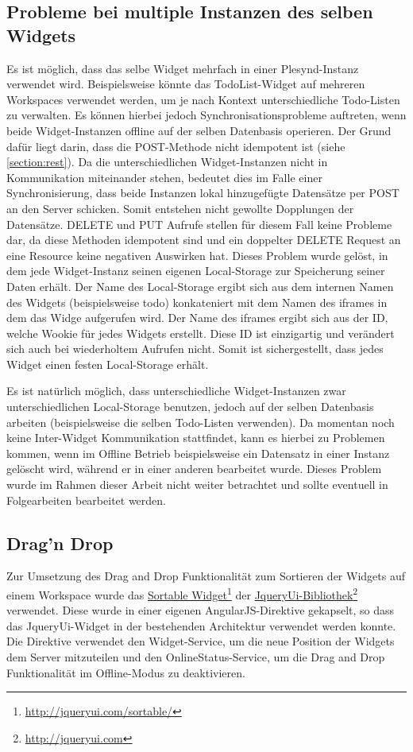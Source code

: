 \subsection{Probleme bei multiple Instanzen des selben Widgets}
Es ist möglich, dass das selbe Widget mehrfach in einer Plesynd-Instanz verwendet wird. Beispielsweise könnte das TodoList-Widget auf mehreren Workspaces verwendet werden, um je nach Kontext unterschiedliche Todo-Listen zu verwalten. Es können hierbei jedoch Synchronisationsprobleme auftreten, wenn beide Widget-Instanzen offline auf der selben Datenbasis operieren. Der Grund dafür liegt darin, dass die POST-Methode nicht idempotent ist (siehe \ref{section:rest}). Da die unterschiedlichen Widget-Instanzen nicht in Kommunikation miteinander stehen, bedeutet dies im Falle einer Synchronisierung, dass beide Instanzen lokal hinzugefügte Datensätze per POST an den Server schicken. Somit entstehen nicht gewollte Dopplungen der Datensätze. DELETE und PUT Aufrufe stellen für diesem Fall keine Probleme dar, da diese Methoden idempotent sind und ein doppelter DELETE Request an eine Resource keine negativen Auswirken hat. Dieses Problem wurde gelöst, in dem jede Widget-Instanz seinen eigenen Local-Storage zur Speicherung seiner Daten erhält. Der Name des Local-Storage ergibt sich aus dem internen Namen des Widgets (beispielsweise todo) konkateniert mit dem Namen des iframes in dem das Widge aufgerufen wird. Der Name des iframes ergibt sich aus der ID, welche Wookie für jedes Widgets erstellt. Diese ID ist einzigartig und verändert sich auch bei wiederholtem Aufrufen nicht. Somit ist sichergestellt, dass jedes Widget einen festen Local-Storage erhält.

Es ist natürlich möglich, dass unterschiedliche Widget-Instanzen zwar unterschiedlichen Local-Storage benutzen, jedoch auf der selben Datenbasis arbeiten (beispielsweise die selben Todo-Listen verwenden). Da momentan noch keine Inter-Widget Kommunikation stattfindet, kann es hierbei zu Problemen kommen, wenn im Offline Betrieb beispielsweise ein Datensatz in einer Instanz gelöscht wird, während er in einer anderen bearbeitet wurde. Dieses Problem wurde im Rahmen dieser Arbeit nicht weiter betrachtet und sollte eventuell in Folgearbeiten bearbeitet werden.

\subsection{Drag'n Drop}
Zur Umsetzung des Drag and Drop Funktionalität zum Sortieren der Widgets auf einem Workspace wurde das \href{http://jqueryui.com/sortable/}{Sortable Widget}\footnote{\url{http://jqueryui.com/sortable/}} der \href{http://jqueryui.com}{JqueryUi-Bibliothek}\footnote{\url{http://jqueryui.com}} verwendet. Diese wurde in einer eigenen AngularJS-Direktive gekapselt, so dass das JqueryUi-Widget in der bestehenden Architektur verwendet werden konnte. Die Direktive verwendet den Widget-Service, um die neue Position der Widgets dem Server mitzuteilen und den OnlineStatus-Service, um die Drag and Drop Funktionalität im Offline-Modus zu deaktivieren.

